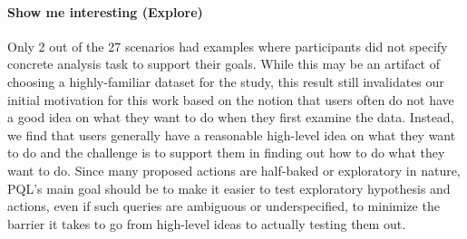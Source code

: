 \documentclass{sig-alternate-05-2015}
\begin{document}
\paragraph{Show me interesting (Explore)} Only 2 out of the 27 scenarios had examples where participants did not specify concrete analysis task to support their goals. While this may be an artifact of choosing a highly-familiar dataset for the study, this result still invalidates our initial motivation for this work based on the notion that users often do not have a good idea on what they want to do when they first examine the data. Instead, we find that users generally have a reasonable high-level idea on what they want to do and the challenge is to support them in finding out how to do what they want to do. Since many proposed actions are half-baked or exploratory in nature, PQL's main goal should be to make it easier to test exploratory hypothesis and actions, even if such queries are ambiguous or underspecified, to minimize the barrier it takes to go from high-level ideas to actually testing them out.
\end{document}

